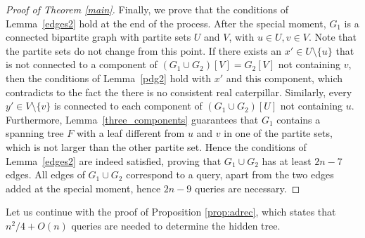 \documentclass[12pt,a4paper]{amsart}
\theoremstyle{plain}
\theoremstyle{definition}
\begin{document}
\begin{proof}[Proof of Theorem \ref{main}]
    Finally, we prove that the conditions of Lemma~\ref{edges2} hold at the end of the process. After the special moment, 
    $G_1$ is a connected bipartite graph with partite sets $U$ and $V$, with $u\in U, v\in V$. Note that the partite sets do not change from this point.
    If there exists an $x' \in U \setminus \{u\}$ that is not connected to a component of $(G_1 \cup G_2)[V]=G_2[V]$ not containing $v$, then the conditions of Lemma~\ref{pdg2} hold with $x'$ and this component, which contradicts to the fact the there is no consistent real caterpillar. Similarly, every $y' \in V \setminus \{v\}$ is connected to each component of $(G_1 \cup G_2)[U]$ not containing $u$.
    Furthermore, Lemma~\ref{three_components} guarantees that $G_1$ contains a spanning tree $F$ with a leaf different from $u$ and $v$ in one of the partite sets, which is not larger than the other partite set. Hence the conditions of Lemma~\ref{edges2} are indeed satisfied, proving that $G_1 \cup G_2$ has at least $2n-7$ edges. All edges of $G_1 \cup G_2$ correspond to a query, apart from the two edges added at the special moment, hence $2n-9$ queries are necessary.
\end{proof}



Let us continue with the proof of Proposition \ref{prop:adrec}, which states that $n^2/4+O(n)$ queries are needed to determine the hidden tree.
\end{document}
